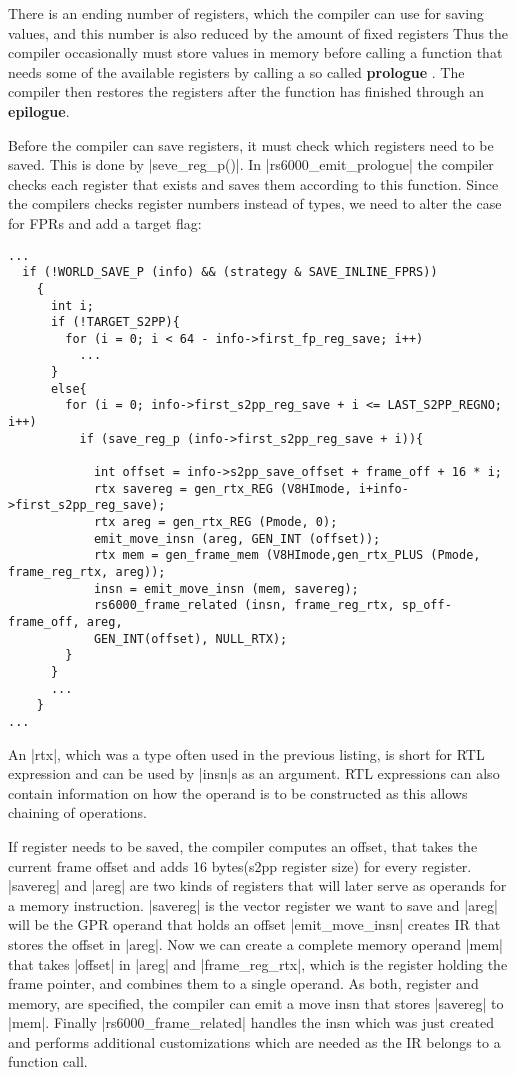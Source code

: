 There is an ending number of registers, which the compiler can use for saving values, and this number is also reduced by the amount of fixed registers
Thus the compiler occasionally must store values in memory before calling a function that needs some of the available registers by calling a so called \textbf{prologue} \citep[ch.~17.9.11]{GCCint}.
The compiler then restores the registers after the function has finished through an \textbf{epilogue}.

Before the compiler can save registers, it must check which registers need to be saved.
This is done by |seve_reg_p()|.
In |rs6000_emit_prologue| the compiler checks each register that exists and saves them according to this function.
Since the compilers checks register numbers instead of types, we need to alter the case for FPRs and add a target flag:
\begin{lstlisting}
...
  if (!WORLD_SAVE_P (info) && (strategy & SAVE_INLINE_FPRS))
    {
      int i;
      if (!TARGET_S2PP){
        for (i = 0; i < 64 - info->first_fp_reg_save; i++)
          ...
      }
      else{
        for (i = 0; info->first_s2pp_reg_save + i <= LAST_S2PP_REGNO; i++)
          if (save_reg_p (info->first_s2pp_reg_save + i)){

            int offset = info->s2pp_save_offset + frame_off + 16 * i;
            rtx savereg = gen_rtx_REG (V8HImode, i+info->first_s2pp_reg_save);
            rtx areg = gen_rtx_REG (Pmode, 0);
            emit_move_insn (areg, GEN_INT (offset));
            rtx mem = gen_frame_mem (V8HImode,gen_rtx_PLUS (Pmode, frame_reg_rtx, areg));
            insn = emit_move_insn (mem, savereg);
            rs6000_frame_related (insn, frame_reg_rtx, sp_off-frame_off, areg,
            GEN_INT(offset), NULL_RTX);
        }
      }
      ...
    }
...
\end{lstlisting}
An |rtx|, which was a type often used in the previous listing, is short for RTL expression and can be used by |insn|s as an argument.
RTL expressions can also contain information on how the operand is to be constructed as this allows chaining of operations.

If register needs to be saved, the compiler computes an offset, that takes the current frame offset and adds 16 bytes(s2pp register size) for every register.
|savereg| and |areg| are two kinds of registers that will later serve as operands for a memory instruction.
|savereg| is the vector register we want to save and |areg| will be the GPR operand that holds an offset
|emit_move_insn| creates IR that stores the offset in |areg|.
Now we can create a complete memory operand |mem| that takes |offset| in |areg| and |frame_reg_rtx|, which is the register holding the frame pointer, and combines them to a single operand.
As both, register and memory, are specified, the compiler can emit a move insn that stores |savereg| to |mem|.
Finally |rs6000_frame_related| handles the insn which was just created and performs additional customizations which are needed as the IR belongs to a function call.

